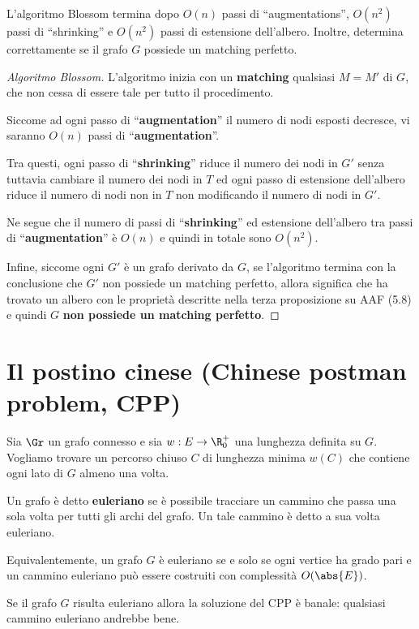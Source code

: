\documentclass[\main/main.tex]{subfiles}
\begin{document}
\begin{theorem}
	L'algoritmo Blossom termina dopo \(O(n)\) passi di ``augmentations'', \(O(n^2)\) passi di ``shrinking'' e \(O(n^2)\) passi di estensione dell'albero. Inoltre, determina correttamente se il grafo \(G\) possiede un matching perfetto.
\end{theorem}
\begin{proof}[Algoritmo Blossom]
	L'algoritmo inizia con un \textbf{matching} qualsiasi \(M=M'\) di \(G\), che non cessa di essere tale per tutto il procedimento.

	Siccome ad ogni passo di ``\textbf{augmentation}'' il numero di nodi esposti decresce, vi saranno \(O(n)\) passi di ``\textbf{augmentation}''.

	Tra questi, ogni passo di ``\textbf{shrinking}'' riduce il numero dei nodi in \(G'\) senza tuttavia cambiare il numero dei nodi in \(T\) ed ogni passo di estensione dell'albero riduce il numero di nodi non in \(T\) non modificando il numero di nodi in \(G'\).

	Ne segue che il numero di passi di ``\textbf{shrinking}'' ed estensione dell'albero tra passi di ``\textbf{augmentation}'' è \(O(n)\) e quindi in totale sono \(O(n^2)\).

	Infine, siccome ogni \(G'\) è un grafo derivato da \(G\), se l'algoritmo termina con la conclusione che \(G'\) non possiede un matching perfetto, allora significa che ha trovato un albero con le proprietà descritte nella terza proposizione su AAF (5.8) e quindi \(G\) \textbf{non possiede un matching perfetto}.
\end{proof}
\clearpage
\section{Il postino cinese (Chinese postman problem, CPP)}
Sia \(\Gr \) un grafo connesso e sia \(w: E \rightarrow \R^+_0\) una lunghezza definita su \(G\). Vogliamo trovare un percorso chiuso \(C\) di lunghezza minima \(w(C)\) che contiene ogni lato di \(G\) almeno una volta.
\begin{definition}
	Un grafo è detto \textbf{euleriano} se è possibile tracciare un cammino che passa una sola volta per tutti gli archi del grafo. Un tale cammino è detto a sua volta euleriano.

	Equivalentemente, un grafo \(G\) è euleriano se e solo se ogni vertice ha grado pari e un cammino euleriano può essere costruiti con complessità \(O(\abs{E})\).
\end{definition}
Se il grafo \(G\) risulta euleriano allora la soluzione del CPP è banale: qualsiasi cammino euleriano andrebbe bene.
\end{document}
